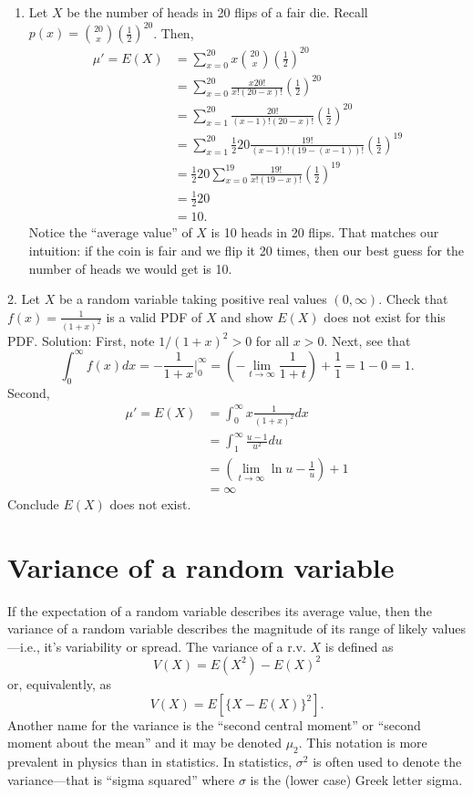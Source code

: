 \documentclass[
]{book}
\providecommand{\tightlist}{%
  \setlength{\itemsep}{0pt}\setlength{\parskip}{0pt}}
\begin{document}
\begin{enumerate}
\def\labelenumi{\arabic{enumi}.}
\tightlist
\item
  Let \(X\) be the number of heads in 20 flips of a fair die. Recall \(p(x) = {20 \choose x}\left(\frac12\right)^20\). Then,
  \begin{align*}
  \mu' = E(X) &= \sum_{x = 0}^{20} x {20 \choose x}\left(\frac12\right)^{20}\\
  &=  \sum_{x = 0}^{20} \frac{x20!}{x!(20-x)!}\left(\frac12\right)^{20}\\
  &=  \sum_{x = 1}^{20} \frac{20!}{(x-1)!(20-x)!}\left(\frac12\right)^{20}\\
  &=  \sum_{x = 1}^{20} \frac12 20\frac{19!}{(x-1)!(19-(x-1))!}\left(\frac12\right)^{19}\\
  & = \frac12 20 \sum_{x = 0}^{19} \frac{19!}{x!(19-x)!}\left(\frac12\right)^{19}\\
  & = \frac12 20\\
  & = 10.
  \end{align*}
  Notice the ``average value'' of \(X\) is 10 heads in 20 flips. That matches our intuition: if the coin is fair and we flip it 20 times, then our best guess for the number of heads we would get is 10.
\end{enumerate}

2. Let \(X\) be a random variable taking positive real values \((0,\infty)\). Check that \(f(x) = \frac{1}{(1+x)^2}\) is a valid PDF of \(X\) and show \(E(X)\) does not exist for this PDF.
Solution:
First, note \(1/(1+x)^2 > 0\) for all \(x>0\). Next, see that
\[\int_0^\infty f(x)dx = -\frac{1}{1+x}|_0^\infty = \left(-\lim_{t\rightarrow \infty}\frac{1}{1+t}\right) + \frac{1}{1} = 1-0 = 1.\]
Second,
\begin{align*}
\mu' = E(X) &= \int_{0}^\infty x\frac{1}{(1+x)^2}dx\\
&= \int_1^\infty \frac{u-1}{u^2}du\\
&= \left(\lim_{t\rightarrow \infty} \ln u - \frac{1}{u}\right) + 1 \\
&= \infty
\end{align*}
Conclude \(E(X)\) does not exist.

\hypertarget{variance-of-a-random-variable}{%
\section{Variance of a random variable}\label{variance-of-a-random-variable}}

If the expectation of a random variable describes its average value, then the variance of a random variable describes the magnitude of its range of likely values---i.e., it's variability or spread. The variance of a r.v. \(X\) is defined as
\[V(X) = E(X^2) - E(X)^2\]
or, equivalently, as
\[V(X) = E[\{X - E(X)\}^2].\]
Another name for the variance is the ``second central moment'' or ``second moment about the mean'' and it may be denoted \(\mu_2\). This notation is more prevalent in physics than in statistics. In statistics, \(\sigma^2\) is often used to denote the variance---that is ``sigma squared'' where \(\sigma\) is the (lower case) Greek letter sigma.
\end{document}
